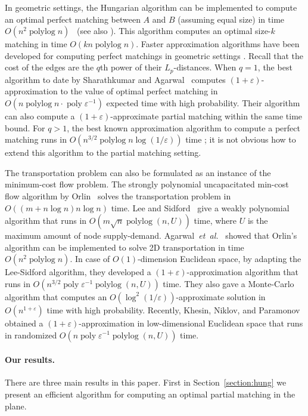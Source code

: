 \documentclass[11pt]{article}
\def\etal{\emph{et~al.}}
\def\etal{\textit{et~al.}}
\def\poly{\mathop{\mathrm{poly}}}
\def\polylog{\mathop{\mathrm{polylog}}}
\def\eps{\varepsilon}
\numberwithin{figure}{section}
\begin{document}
In geometric settings, the Hungarian algorithm can be implemented to compute
an optimal perfect matching between $A$ and $B$ (assuming equal size)
in time $O(n^2\polylog n)$~\cite{KMRSS17} (see also \cite{Vaidya89,AES99}).
This algorithm computes an optimal size-$k$ matching in time $O(kn\polylog n)$.
Faster approximation algorithms have been developed for computing perfect
matchings in geometric settings \cite{Vaidya89,V98,AV04,SA12}.
Recall that the cost of the edges are the $q$th power of their $L_p$-distances.
When $q = 1$, the best algorithm to date by Sharathkumar and Agarwal~\cite{SA12m}
computes $(1+\eps)$-approximation to the value of optimal perfect matching in
$O(n\polylog n \cdot \poly\eps^{-1})$ expected time with high probability.
Their algorithm can also compute a $(1+\eps)$-approximate partial
matching within the same time bound.
For $q > 1$, the best known approximation algorithm to compute a perfect
matching runs in $O(n^{3/2}\polylog n \log(1/\eps))$ time \cite{SA12};
it is not obvious how to extend this algorithm to the partial matching setting.

The transportation problem can also be formulated as an instance of the
minimum-cost flow problem.
The strongly polynomial uncapacitated min-cost flow algorithm by
Orlin~\cite{O93} solves the transportation problem in
$O((m + n\log n) n\log n)$ time.
Lee and Sidford~\cite{LS14} give a weakly polynomial algorithm that runs in
$O(m\sqrt{n}\polylog(n, U))$ time, where $U$ is the maximum amount of node supply-demand.
Agarwal~\etal~\cite{AFPVX17, AFPVX17arxiv} showed that Orlin's algorithm can be
implemented to solve 2D transportation in time $O(n^2\polylog n)$.
In case of $O(1)$-dimension Euclidean space,
by adapting the Lee-Sidford algorithm, they developed a
$(1+\eps)$-approximation algorithm that runs in $O(n^{3/2} \poly\eps^{-1} \polylog(n, U))$ time.
They also gave a Monte-Carlo algorithm that computes an
$O(\log^2(1/\eps))$-approximate solution in $O(n^{1+\eps})$ time with
high probability.
Recently, Khesin, Niklov, and Paramonov~\cite{KNP19} obtained a
$(1+\eps)$-approximation in low-dimensional Euclidean space
that runs in randomized $O(n \poly\eps^{-1} \polylog(n, U))$ time. %

\paragraph*{Our results.}
There are three main results in this paper.
First in Section~\ref{section:hung} we present an efficient algorithm for
computing an optimal partial matching in the plane.
\end{document}
